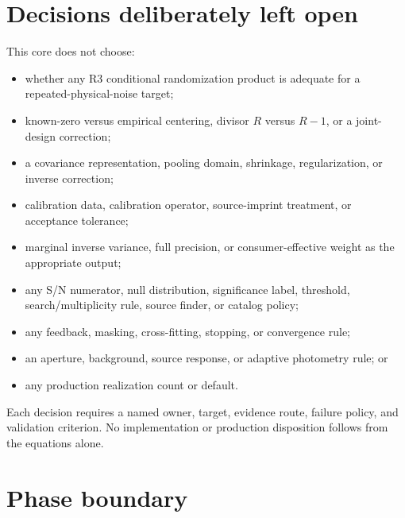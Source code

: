 \documentclass[11pt]{article}
\begin{document}
\section{Decisions deliberately left open}

This core does not choose:
\begin{itemize}
\item whether any R3 conditional randomization product is adequate for a
repeated-physical-noise target;
\item known-zero versus empirical centering, divisor $R$ versus $R-1$, or a
joint-design correction;
\item a covariance representation, pooling domain, shrinkage, regularization,
or inverse correction;
\item calibration data, calibration operator, source-imprint treatment, or
acceptance tolerance;
\item marginal inverse variance, full precision, or consumer-effective weight
as the appropriate output;
\item any S/N numerator, null distribution, significance label, threshold,
search/multiplicity rule, source finder, or catalog policy;
\item any feedback, masking, cross-fitting, stopping, or convergence rule;
\item an aperture, background, source response, or adaptive photometry rule;
or
\item any production realization count or default.
\end{itemize}
Each decision requires a named owner, target, evidence route, failure policy,
and validation criterion.  No implementation or production disposition follows
from the equations alone.

\section{Phase boundary}
\end{document}
